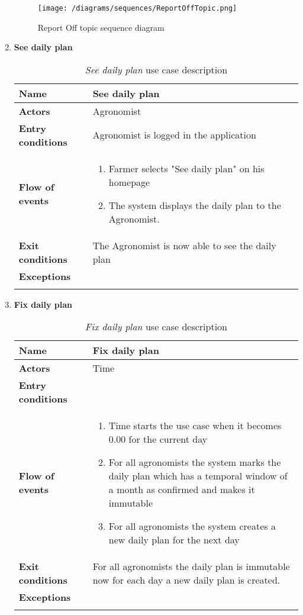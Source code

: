\begin{enumerate}
				\begin{figure}[hbtp]
					\centering
					\texttt{[image: /diagrams/sequences/ReportOffTopic.png]}
					\caption{Report Off topic sequence diagram}
				\end{figure}
			
			\item \textbf{See daily plan}
				\begin{longtable}{p{0.26\linewidth}p{0.75\linewidth}}
					\toprule
					\textbf{Name} & \textbf{See daily plan} \\
					\midrule
					\textbf{Actors} & Agronomist \\
					\midrule
					\textbf{Entry conditions} &	Agronomist is logged in the application\\
					\midrule
					\textbf{Flow of events} & 
					\begin{enumerate}
						\item Farmer selects "See daily plan" on his homepage
						\item The system displays the daily plan to the Agronomist.
					\end{enumerate} \\
					\midrule
					\textbf{Exit conditions} & The Agronomist is now able to see the daily plan\\
					\midrule
					\textbf{Exceptions} &  \\
					\bottomrule
					\caption{\emph{See daily plan} use case description}
				\end{longtable}
			
			\item \textbf{Fix daily plan}
				\begin{longtable}{p{0.26\linewidth}p{0.75\linewidth}}
					\toprule
					\textbf{Name} & \textbf{Fix daily plan} \\
					\midrule
					\textbf{Actors} & Time \\
					\midrule
					\textbf{Entry conditions} & \\
					\midrule
					\textbf{Flow of events} & 
					\begin{enumerate}
						\item Time starts the use case when it becomes 0.00 for the current day
						\item For all agronomists the system marks the daily plan which has a temporal window of a month as confirmed and makes it immutable
						\item For all agronomists the system creates a new daily plan for the next day
					\end{enumerate} \\
					\midrule
					\textbf{Exit conditions} & For all agronomists the daily plan is immutable now for each day a new daily plan is created. \\
					\midrule
					\textbf{Exceptions} &  \\
					\bottomrule
					\caption{\emph{Fix daily plan} use case description}
				\end{longtable}
			

\end{enumerate}

